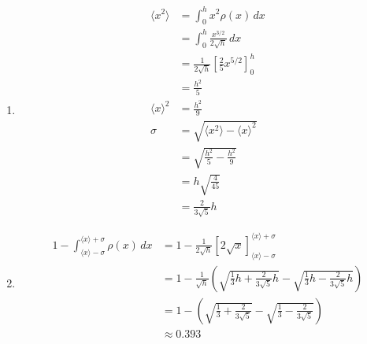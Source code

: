 \documentclass{article}
\begin{document}
\begin{enumerate}
  \item

        \begin{align*}
          \langle x^2 \rangle & = \int_0^h x^2 \rho(x) \,d x                                    \\
                              & = \int_0^h \frac{x^{3 / 2}}{2 \sqrt{h}} \,d x                   \\
                              & = \frac{1}{2 \sqrt{h}} \left[ \frac{2}{5} x^{5 / 2} \right]_0^h \\
                              & = \frac{h^2}{5}                                                 \\
          \langle x \rangle^2 & = \frac{h^2}{9}                                                 \\
          \sigma              & = \sqrt{\langle x^2 \rangle - \langle x \rangle^2}              \\
                              & = \sqrt{\frac{h^2}{5} - \frac{h^2}{9}}                          \\
                              & = h \sqrt{\frac{4}{45}}                                         \\
                              & = \frac{2}{3 \sqrt{5}} h
        \end{align*}

  \item

        \begin{align*}
          1 - \int_{\langle x \rangle - \sigma}^{\langle x \rangle + \sigma} \rho(x) \,d x & = 1 - \frac{1}{2 \sqrt{h}} [2 \sqrt{x}]_{\langle x \rangle - \sigma}^{\langle x \rangle + \sigma}                                     \\
                                                                                           & = 1 - \frac{1}{\sqrt{h}} \left( \sqrt{\frac{1}{3} h + \frac{2}{3 \sqrt{5}} h} - \sqrt{\frac{1}{3} h - \frac{2}{3 \sqrt{5}} h} \right) \\
                                                                                           & = 1 - \left( \sqrt{\frac{1}{3} + \frac{2}{3 \sqrt{5}}} - \sqrt{\frac{1}{3} - \frac{2}{3 \sqrt{5}}} \right)                            \\
                                                                                           & \approx 0.393
        \end{align*}
\end{enumerate}
\end{document}
